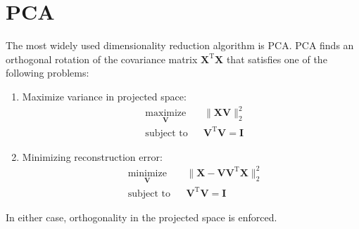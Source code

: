 \documentclass{article}
\begin{document}
\section*{PCA}
The most widely used dimensionality reduction algorithm is PCA.  PCA finds an  orthogonal rotation of the covariance matrix $\mathbf{X}^{\mathrm{T}}\mathbf{X}$ that satisfies one of the following problems:
\begin{enumerate}
\item Maximize variance in projected space: 
\begin{equation}
\begin{aligned}
& \underset{\mathbf{V}}{\text{maximize}} & &\| \mathbf{X} \mathbf{V} \|_2^2 \\ 
&\text{subject to} & &\mathbf{V}^{\mathrm{T}} \mathbf{V} = \mathbf{I}
\end{aligned}
\end{equation}
\item Minimizing reconstruction error:
\begin{equation}
\begin{aligned}
& \underset{\mathbf{V}}{\text{minimize}} & &  \| \mathbf{X} - \mathbf{VV}^{\mathrm{T}}  \mathbf{X}\|_2^2 \\ 
&\text{subject to} & & \mathbf{V}^{\mathrm{T}} \mathbf{V}= \mathbf{I}
\end{aligned}
\label{eqn:reconstruction_error}
\end{equation}
\end{enumerate} 
In either case, orthogonality in the projected space is enforced.
 
\end{document}
